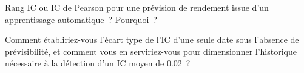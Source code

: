 \begin{interviewq}\label{iq:rs:anatomy-of-a-predictor:5}
Rang IC ou IC de Pearson pour une prévision de rendement issue d'un apprentissage automatique~? Pourquoi~?
\end{interviewq}

\begin{interviewq}\label{iq:rs:anatomy-of-a-predictor:6}
Comment établiriez-vous l'écart type de l'IC d'une seule date sous l'absence de prévisibilité, et comment vous en serviriez-vous
pour dimensionner l'historique nécessaire à la détection d'un IC moyen de 0.02~?
\end{interviewq}
